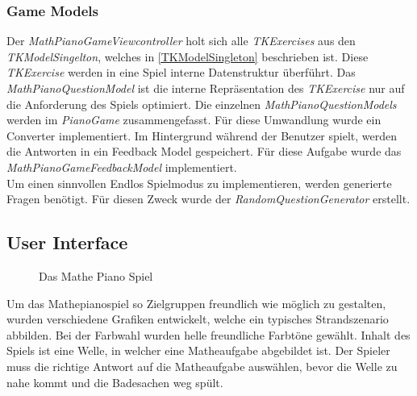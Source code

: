 \subsubsection{Game Models}
Der \textit{MathPianoGameViewcontroller} holt sich alle \textit{TKExercises} aus den \textit{TKModelSingelton}, welches in \ref{TKModelSingleton}  beschrieben ist. Diese \textit{TKExercise} werden in eine Spiel interne Datenstruktur überführt. Das \textit{MathPianoQuestionModel} ist die interne Repräsentation des \textit{TKExercise} nur auf die Anforderung des Spiels optimiert. Die einzelnen \textit{MathPianoQuestionModels} werden im \textit{PianoGame} zusammengefasst. Für diese Umwandlung wurde ein Converter implementiert. 
Im Hintergrund während der Benutzer spielt, werden die Antworten in ein Feedback Model gespeichert. Für diese Aufgabe wurde das \textit{MathPianoGameFeedbackModel} implementiert. \\
Um einen sinnvollen Endlos Spielmodus zu implementieren, werden generierte Fragen benötigt. Für diesen Zweck wurde der \textit{RandomQuestionGenerator} erstellt.

\subsection{User Interface}
\begin{figure}[H]
	\centering
	\caption{Das Mathe Piano Spiel}
	\label{Das Mathe Piano Spiel}
\end{figure}
Um das Mathepianospiel so Zielgruppen freundlich wie möglich zu gestalten, wurden verschiedene Grafiken entwickelt, welche ein typisches Strandszenario abbilden. Bei der Farbwahl wurden helle freundliche Farbtöne gewählt. Inhalt des Spiels ist eine Welle, in welcher eine Matheaufgabe abgebildet ist. Der Spieler muss die richtige Antwort auf die Matheaufgabe auswählen, bevor die Welle zu nahe kommt und die Badesachen weg spült.



